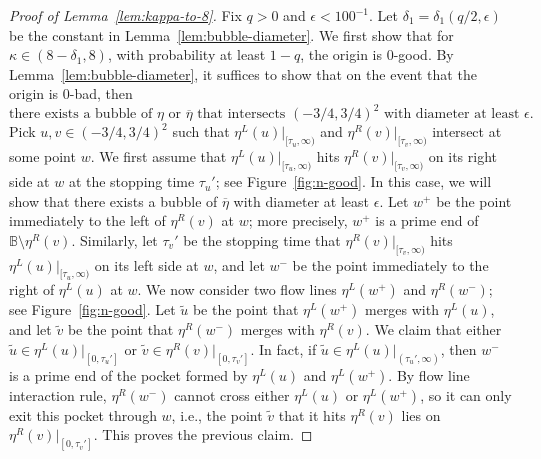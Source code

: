 \documentclass[a4paper]{article}
\numberwithin{equation}{section}
\numberwithin{equation}{section}
\renewcommand{\1}{\mathbf{1}}
\begin{document}
\begin{proof}[Proof of Lemma~\ref{lem:kappa-to-8}]
    Fix $q>0$ and $\epsilon<100^{-1}$. Let $\delta_1=\delta_1(q/2,\epsilon)$ be the constant in Lemma~\ref{lem:bubble-diameter}. We first show that for $\kappa \in (8-\delta_1,8)$, with probability at least $1-q$, the origin is $0$-good. By Lemma~\ref{lem:bubble-diameter}, it suffices to show that on the event that the origin is $0$-bad, then
    \begin{equation}\label{eq:find-bubble}
        \mbox{there exists a bubble of } \eta \mbox{ or } \overline \eta \mbox{ that intersects } (-3/4,3/4)^2 \mbox{ with diameter at least } \epsilon.
    \end{equation}
    Pick $u,v \in (-3/4,3/4)^2$ such that $\eta^L(u)|_{[\tau_u,\infty)}$ and $\eta^R(v)|_{[\tau_v,\infty)}$ intersect at some point $w$. We first assume that $\eta^L(u)|_{[\tau_u,\infty)}$ hits $\eta^R(v)|_{[\tau_v,\infty)}$ on its right side at $w$ at the stopping time $\tau_u'$; see Figure~\ref{fig:n-good}. In this case, we will show that there exists a bubble of $\overline\eta$ with diameter at least $\epsilon$. Let $w^+$ be the point immediately to the left of $\eta^R(v)$ at $w$; more precisely, $w^+$ is a prime end of $\mathbb B \setminus \eta^R(v)$.
    Similarly, let $\tau_v'$ be the stopping time that $\eta^R(v)|_{[\tau_v,\infty)}$ hits $\eta^L(u)|_{[\tau_u,\infty)}$ on its left side at $w$, and let $w^-$ be the point immediately to the right of $\eta^L(u)$ at $w$.
    We now consider two flow lines $\eta^L(w^+)$ and $\eta^R(w^-)$; see Figure~\ref{fig:n-good}. Let $\widetilde u$ be the point that $\eta^L(w^+)$ merges with $\eta^L(u)$, and let $\widetilde v$ be the point that $\eta^R(w^-)$ merges with $\eta^R(v)$. We claim that either $\widetilde u \in \eta^L(u)|_{[0,\tau_u']}$ or $\widetilde v \in \eta^R(v)|_{[0,\tau_v']}$. In fact, if $\widetilde u \in \eta^L(u)|_{(\tau_u',\infty)}$, then $w^-$ is a prime end of the pocket formed by $\eta^L(u)$ and $\eta^L(w^+)$. By flow line interaction rule, $\eta^R(w^-)$ cannot cross either $\eta^L(u)$ or $\eta^L(w^+)$, so it can only exit this pocket through $w$, i.e., the point $\widetilde v$ that it hits $\eta^R(v)$ lies on $\eta^R(v)|_{[0,\tau_v']}$. This proves the previous claim.


\end{proof}
\end{document}
